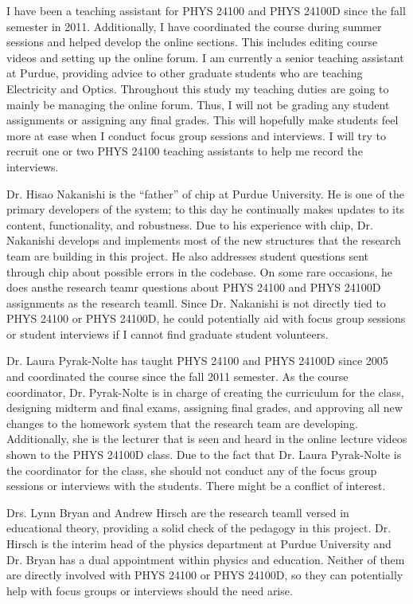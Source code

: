I have been a teaching assistant for PHYS 24100 and PHYS 24100D since the fall semester in 2011. Additionally, I have coordinated the course during summer sessions and helped develop the online sections. This includes editing course videos and setting up the online forum\cite{piazza}. I am currently a senior teaching assistant at Purdue, providing advice to other graduate students who are teaching Electricity and Optics. Throughout this study my teaching duties are going to mainly be managing the online forum. Thus, I will not be grading any student assignments or assigning any final grades. This will hopefully make students feel more at ease when I conduct focus group sessions and interviews. I will try to recruit one or two PHYS 24100 teaching assistants to help me record the interviews.

Dr. Hisao Nakanishi is the ``father'' of \gls{chip} at Purdue University. He is one of the primary developers of the system; to this day he continually makes updates to its content, functionality, and robustness. Due to his experience with \gls{chip}, Dr. Nakanishi develops and implements most of the new structures that the research team are building in this project. He also addresses student questions sent through \gls{chip} about possible errors in the codebase. On some rare occasions, he does ansthe research teamr questions about PHYS 24100 and PHYS 24100D assignments as the research teamll. Since Dr. Nakanishi is not directly tied to PHYS 24100 or PHYS 24100D, he could potentially aid with focus group sessions or student interviews if I cannot find graduate student volunteers.

Dr. Laura Pyrak-Nolte has taught PHYS 24100 and PHYS 24100D since 2005 and coordinated the course since the fall 2011 semester. As the course coordinator, Dr. Pyrak-Nolte is in charge of creating the curriculum for the class, designing midterm and final exams, assigning final grades, and approving all new changes to the homework system that the research team are developing. Additionally, she is the lecturer that is seen and heard in the online lecture videos shown to the PHYS 24100D class. Due to the fact that Dr. Laura Pyrak-Nolte is the coordinator for the class, she should not conduct any of the focus group sessions or interviews with the students. There might be a conflict of interest.

Drs. Lynn Bryan and Andrew Hirsch are the research teamll versed in educational theory, providing a solid check of the pedagogy in this project. Dr. Hirsch is the interim head of the physics department at Purdue University and Dr. Bryan has a dual appointment within physics and education. Neither of them are directly involved with PHYS 24100 or PHYS 24100D, so they can potentially help with focus groups or interviews should the need arise.

